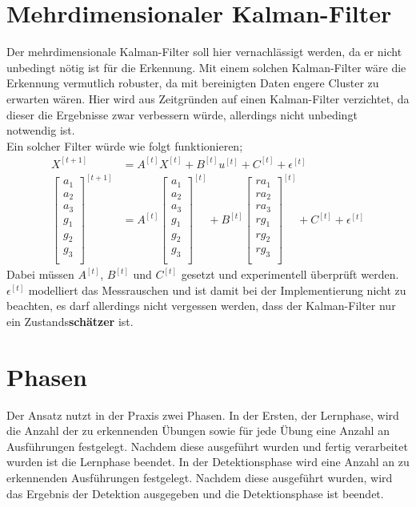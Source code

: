 \documentclass{article}
\begin{document}
\section{Mehrdimensionaler Kalman-Filter}
Der mehrdimensionale Kalman-Filter soll hier vernachlässigt werden, da er nicht unbedingt nötig ist für die Erkennung.
Mit einem solchen Kalman-Filter wäre die Erkennung vermutlich robuster, da mit bereinigten Daten \glqq engere \grqq{} Cluster zu erwarten wären.
Hier wird aus Zeitgründen auf einen Kalman-Filter verzichtet, da dieser die Ergebnisse zwar verbessern würde, allerdings nicht unbedingt notwendig ist.\\
Ein solcher Filter würde wie folgt funktionieren;
\begin{align*}
X^{[t+1]} &= A^{[t]}X^{[t]} + B^{[t]}u^{[t]} + C^{[t]} + \epsilon^{[t]}\\
\left[\begin{array}{r}
a_{1}\\
a_{2}\\
a_{3}\\
g_{1}\\
g_{2}\\
g_{3}\\
\end{array}\right]^{[t+1]}
&= A^{[t]} \left[\begin{array}{r}
a_{1}\\
a_{2}\\
a_{3}\\
g_{1}\\
g_{2}\\
g_{3}\\
\end{array}\right]^{[t]}
+ B^{[t]}\left[\begin{array}{r}
ra_{1}\\
ra_{2}\\
ra_{3}\\
rg_{1}\\
rg_{2}\\
rg_{3}\\
\end{array}\right]^{[t]}
+ C^{[t]} + \epsilon^{[t]}
\end{align*}
Dabei müssen $A^{[t]}$, $B^{[t]}$ und $C^{[t]}$ gesetzt und experimentell überprüft werden.
$\epsilon^{[t]}$ modelliert das Messrauschen und ist damit bei der Implementierung nicht zu beachten, es darf allerdings nicht vergessen werden, dass der Kalman-Filter nur ein Zustands\textbf{schätzer} ist.

\section{Phasen}
Der Ansatz nutzt in der Praxis zwei Phasen.
In der Ersten, der Lernphase, wird die Anzahl der zu erkennenden Übungen sowie für jede Übung eine Anzahl an Ausführungen festgelegt.
Nachdem diese ausgeführt wurden und fertig verarbeitet wurden ist die Lernphase beendet.
In der Detektionsphase wird eine Anzahl an zu erkennenden Ausführungen festgelegt.
Nachdem diese ausgeführt wurden, wird das Ergebnis der Detektion ausgegeben und die Detektionsphase ist beendet.
\end{document}
